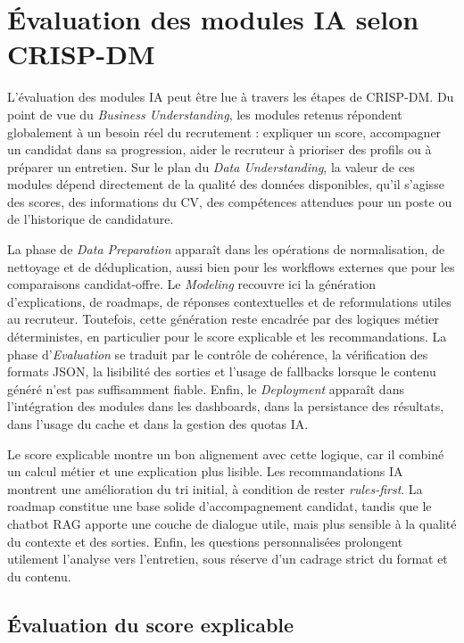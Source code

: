 \section{Évaluation des modules IA selon CRISP-DM}

L'évaluation des modules IA peut être lue à travers les étapes de CRISP-DM. Du point de vue du \textit{Business Understanding}, les modules retenus répondent globalement à un besoin réel du recrutement : expliquer un score, accompagner un candidat dans sa progression, aider le recruteur à prioriser des profils ou à préparer un entretien. Sur le plan du \textit{Data Understanding}, la valeur de ces modules dépend directement de la qualité des données disponibles, qu'il s'agisse des scores, des informations du CV, des compétences attendues pour un poste ou de l'historique de candidature.

La phase de \textit{Data Preparation} apparaît dans les opérations de normalisation, de nettoyage et de déduplication, aussi bien pour les workflows externes que pour les comparaisons candidat-offre. Le \textit{Modeling} recouvre ici la génération d'explications, de roadmaps, de réponses contextuelles et de reformulations utiles au recruteur. Toutefois, cette génération reste encadrée par des logiques métier déterministes, en particulier pour le score explicable et les recommandations. La phase d'\textit{Evaluation} se traduit par le contrôle de cohérence, la vérification des formats JSON, la lisibilité des sorties et l'usage de fallbacks lorsque le contenu généré n'est pas suffisamment fiable. Enfin, le \textit{Deployment} apparaît dans l'intégration des modules dans les dashboards, dans la persistance des résultats, dans l'usage du cache et dans la gestion des quotas IA.

Le score explicable montre un bon alignement avec cette logique, car il combiné un calcul métier et une explication plus lisible. Les recommandations IA montrent une amélioration du tri initial, à condition de rester \textit{rules-first}. La roadmap constitue une base solide d'accompagnement candidat, tandis que le chatbot RAG apporte une couche de dialogue utile, mais plus sensible à la qualité du contexte et des sorties. Enfin, les questions personnalisées prolongent utilement l'analyse vers l'entretien, sous réserve d'un cadrage strict du format et du contenu.

\subsection{Évaluation du score explicable}

